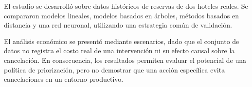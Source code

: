 El estudio se desarrolló sobre datos históricos de reservas de dos hoteles
reales. Se compararon modelos lineales, modelos basados en árboles, métodos
basados en distancia y una red neuronal, utilizando una estrategia común de
validación.

El análisis económico se presentó mediante escenarios, dado que el conjunto
de datos no registra el costo real de una intervención ni su efecto causal
sobre la cancelación. En consecuencia, los resultados permiten evaluar el
potencial de una política de priorización, pero no demostrar que una acción
específica evita cancelaciones en un entorno productivo.
